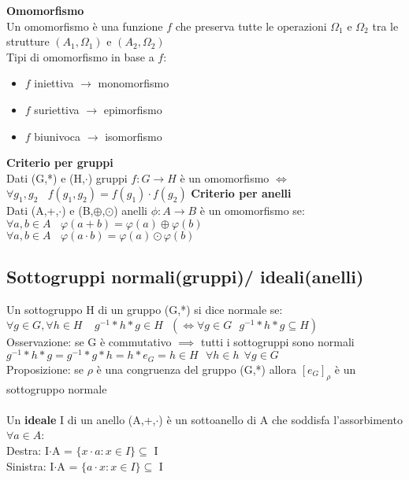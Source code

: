 \documentclass{article}
\begin{document}
\begin{multicols*}{3}
		\textbf{Omomorfismo}\\
		Un omomorfismo è una funzione \(f\) che preserva tutte le operazioni \(\Omega_1 \) e \(\Omega_2 \) tra le strutture \((A_1, \Omega_1)\) e \((A_2, \Omega_2)\)\\
		Tipi di omomorfismo in base a \(f\):
		\begin{itemize}
			\item \(f\) iniettiva \(\rightarrow\) monomorfismo
			\item \(f\) suriettiva \(\rightarrow\) epimorfismo
			\item \(f\) biunivoca \(\rightarrow\) isomorfismo			
		\end{itemize}
		\textbf{Criterio per gruppi}\\
		Dati (G,*) e (H,\(\cdot\)) gruppi \(f:G\rightarrow H\) è un omomorfismo \(\iff\) \(\forall g_1,g_2 \:\:\:\: f(g_1,g_2) = f(g_1) \cdot f(g_2)\)
		\textbf{Criterio per anelli}\\
		Dati (A,+,\(\cdot\)) e (B,\(\oplus\),\(\odot\)) anelli \(\phi : A\rightarrow B\) è un omomorfismo se:\\
		\(\forall a,b \in A \:\:\:\: \varphi(a+b) = \varphi(a) \oplus \varphi (b) \)\\
		\(\forall a,b \in A \:\:\:\: \varphi(a\cdot b) = \varphi(a) \odot \varphi (b) \)\\
		\subsection{Sottogruppi normali(gruppi)/ ideali(anelli)}
		Un sottogruppo H di un gruppo (G,*) si dice normale se:\\
		\(\forall g \in G, \forall h \in H \:\:\:\:\: g^{-1} *h*g \in H \:\:\: (\iff \forall g\in G \:\:\: g^{-1}*h*g \subseteq H)\)\\
		Osservazione: se G è commutativo \(\implies\) tutti i sottogruppi sono normali
		\(g^{-1}*h*g=g^{-1}*g*h=h*e_G=h\in H \:\:\: \forall h \in h \:\: \forall g \in G \)\\
		Proposizione: se \(\rho\) è una congruenza del gruppo (G,*) allora \([e_G]_\rho\) è un sottogruppo normale\\\\
		Un \textbf{ideale} I di un anello (A,+,\(\cdot\)) è un sottoanello di A che soddisfa l'assorbimento \(\forall a \in A\):\\
		Destra: I\(\cdot\)A = \(\{x\cdot a: x\in I\}\subseteq\) I\\
		Sinistra: I\(\cdot\)A = \(\{a \cdot x: x \in  I\} \subseteq\) I\\
		
		
		
		
		
		
		\end{multicols*}
\end{document}
